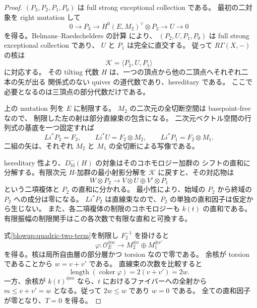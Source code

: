 \begin{proof}
$(P_3,P_2,P_1,P_0)$ は full strong exceptional collection である。
最初の二対象を right mutation して
\[
 0\longrightarrow P_3\longrightarrow
 H^0(E,M_2)^\vee\otimes P_2\longrightarrow U\longrightarrow0
\]
を得る。Belmans--Raedschelders の計算
\cite[命題3.12]{QuadricBR2020} により、
$(P_2,U,P_1,P_0)$ は full strong exceptional collection であり、
$U$ と $P_1$ は完全に直交する。
従って $R\Gamma(X,-)$ の核は
\[
 \mathcal K=\langle P_2,U,P_1\rangle
\]
に対応する。
その tilting 代数 $H$ は、一つの頂点から他の二頂点へそれぞれ二本の矢が出る
関係式のない quiver の道代数であり、hereditary である。
ここで必要となるのは三頂点の部分代数だけである。

上の mutation 列を $E$ に制限する。
$M_2$ の二次元の全切断空間は basepoint-free なので、
制限した左の射は部分直線束の包含になる。
二次元ベクトル空間の行列式の基底を一つ固定すれば
\begin{equation}\label{blowup:quadric-mutated-restriction}
 Li^*P_2=F_2,\qquad Li^*U=F_2\otimes M_2,\qquad
 Li^*P_1=F_2\otimes M_1.
\end{equation}
二組の矢は、それぞれ $M_2$ と $M_1$ の全切断による写像である。

hereditary 性より、$D^-_{\mathrm{fd}}(H)$ の対象はそのコホモロジー加群の
シフトの直和に分解する。有限次元 $H$-加群の最小射影分解を
$\mathcal K$ に戻すと、その対応物は
\begin{equation}\label{blowup:quadric-two-term}
 W\otimes P_2\longrightarrow
 V\otimes U\oplus V'\otimes P_1
\end{equation}
という二項複体と $P_2$ の直和に分かれる。
最小性により、始域の $P_2$ から終域の $P_2$ への成分は零になる。
$Li^*P_2$ は直線束なので、$P_2$ の単独の直和因子は仮定から生じない。
また、各二項複体の制限のコホモロジーも $k(t)$ の直和である。
有限振幅の制限関手はこの各次数で有限な直和と可換する。

式\eqref{blowup:quadric-two-term}を制限し $F_2^{-1}$ を掛けると
\[
 \varphi\colon\mathcal O_E^{\oplus w}\longrightarrow
 M_2^{\oplus v}\oplus M_1^{\oplus v'}
\]
を得る。核は局所自由層の部分層かつ torsion なので零である。
余核が torsion であることから $w=v+v'$ である。
直線束の次数を比較すると
\[
 \operatorname{length}(\operatorname{coker}\varphi)=2(v+v')=2w.
\]
一方、余核が $k(t)^{\oplus m}$ なら、$t$ におけるファイバーへの全射から
$m\le v+v'=w$ となる。従って $2w\le w$ であり $w=0$ である。
全ての直和因子が零となり、$T=0$ を得る。
\end{proof}

